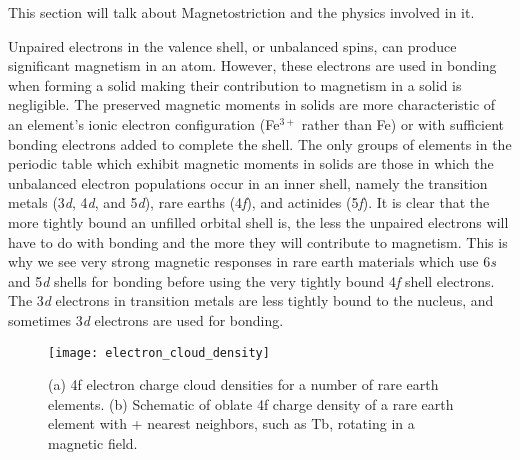 

This section will talk about Magnetostriction and the physics involved in it. 

Unpaired electrons in the valence shell, or unbalanced spins, can produce significant magnetism in an atom.  However, these electrons are used in bonding when forming a solid making their contribution to magnetism in a solid is negligible\cite{Breu2008}.  The preserved magnetic moments in solids are more characteristic of an element’s ionic electron configuration (Fe{$^{3+}$} rather than Fe) or with sufficient bonding electrons added to complete the shell.  The only groups of elements in the periodic table which exhibit magnetic moments in solids are those in which the unbalanced electron populations occur in an inner shell, namely the transition metals (3\textit{d}, 4\textit{d}, and 5\textit{d}), rare earths (4\textit{f}), and actinides (5\textit{f}).  It is clear that the more tightly bound an unfilled orbital shell is, the less the unpaired electrons will have to do with bonding and the more they will contribute to magnetism.  This is why we see very strong magnetic responses in rare earth materials which use 6\textit{s} and 5\textit{d} shells for bonding before using the very tightly bound 4\textit{f} shell electrons.  The 3\textit{d} electrons in transition metals are less tightly bound to the nucleus, and sometimes 3\textit{d} electrons are used for bonding.  \\

\begin{figure}[h] 
	\centering
	\texttt{[image: electron\_cloud\_density]}
	\caption{(a) 4f electron charge cloud densities for a number of rare earth elements. (b) Schematic of oblate 4f charge density of a rare earth element with + nearest neighbors, such as Tb, rotating in a magnetic field. \cite{Engdahl1999} 
	}
	\label{fig:electron_cloud_density}		
\end{figure}

